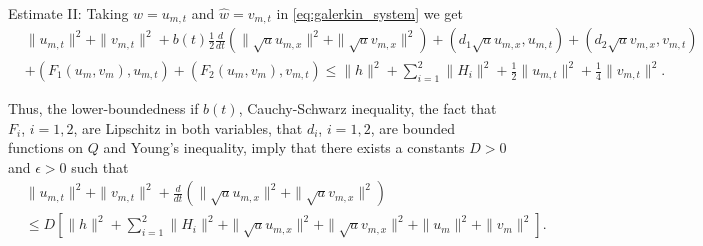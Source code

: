 \documentclass[11pt,oneside,a4papper]{osajnl}
\begin{document}
\begin{itemize}
Estimate II: Taking $w=u_{m,t}$ and $\hat{w}=v_{m,t}$ in \eqref{eq:galerkin_system}  we get
\begin{equation*}
	\begin{split}
		&\|u_{m,t}\|^2 + \|v_{m,t}\|^2 + b(t) \frac{1}{2}\frac{d}{dt} \left( \|\sqrt{a}u_{m,x}\|^2 + \|\sqrt{a}v_{m,x}\|^2 \right) + (d_1 \sqrt{a} u_{m,x},u_{m,t}) + (d_2 \sqrt{a}v_{m,x},v_{m,t})\\
        &+(F_1(u_m,v_{m}),u_{m,t}) + (F_2(u_m,v_m),v_{m,t}) \leq \|h\|^2 + \sum_{i=1}^2  \|H_i\|^2 + \frac{1}{2}\|u_{m,t}\|^2 + \frac{1}{4} \|v_{m,t}\|^2.
	\end{split}
\end{equation*}

Thus, the lower-boundedness if $b(t)$, Cauchy-Schwarz inequality, the fact that $F_i$, $i=1,2$, are Lipschitz in both variables, that $d_i$, $i=1,2$, are bounded functions on $Q$ and Young's inequality, imply that there exists a constants $D>0$ and $\epsilon>0$ such that 
\begin{equation*}
	\begin{split}
		&\|u_{m,t}\|^2 + \|v_{m,t}\|^2 + \frac{d}{dt} \left( \|\sqrt{a}u_{m,x}\|^2 + \|\sqrt{a}v_{m,x}\|^2 \right) \\
		&\leq D \left[ \|h\|^2 + \sum_{i=1}^2  \|H_i\|^2 + \|\sqrt{a}u_{m,x}\|^2 + \|\sqrt{a}v_{m,x}\|^2 + \|u_m\|^2 + \|v_m\|^2 \right].  
	\end{split}
\end{equation*}



\end{itemize}
\end{document}
